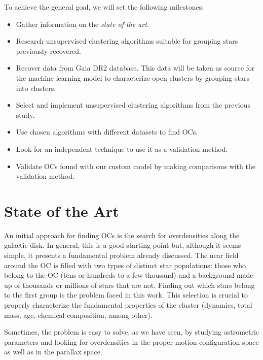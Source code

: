\documentclass[11pt, a4paper, english]{book}
\begin{document}
To achieve the general goal, we will set the following milestones:

\begin{itemize}
  \item Gather information on the \emph{state of the art}.
  \item Research unsupervised clustering algorithms suitable for grouping stars previously recovered.
  \item Recover data from Gaia DR2 database. This data will be taken as source for the machine learning model to characterize open clusters
  by grouping stars into clusters.
  \item Select and implement unsupervised clustering algorithms from the previous study.
  \item Use chosen algorithms with different datasets to find OCs.
  \item Look for an independent technique to use it as a validation method.
  \item Validate OCs found with our custom model by making comparisons with the validation method.
\end{itemize}

\chapter{State of the Art}

An initial approach for finding OCs is the search for overdensities along the galactic disk.
In general, this is a good starting point but, although it seems simple,
it presents a fundamental problem already discussed.
The near field around the OC is filled with two types of distinct star populations:
those who belong to the OC (tens or hundreds to a few thousand)
and a background made up of thousands or millions of stars that are not.
Finding out which stars belong to the first group is the problem faced in this work.
This selection is crucial to properly characterize the fundamental properties of the cluster
(dynamics, total mass, age, chemical composition, among other).

Sometimes, the problem is easy to solve, as we have seen, by studying astrometric parameters
and looking for overdensities in the proper motion configuration space as well as in the parallax space.
\end{document}
